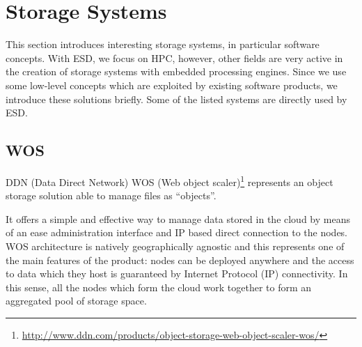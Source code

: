 \section{Storage Systems}
\label{sec: background/storage systems}

This section introduces interesting storage systems, in particular software concepts.
With ESD, we focus on HPC, however, other fields are very active in the creation of storage systems with embedded processing engines.
Since we use some low-level concepts which are exploited by existing software products, we introduce these solutions briefly.
Some of the listed systems are directly used by ESD.

\subsection{WOS}
\label{WOS background}

DDN (Data Direct Network) WOS (Web object scaler)\footnote{\url{http://www.ddn.com/products/object-storage-web-object-scaler-wos/}} represents an object storage solution able to manage files as ``objects''.

It offers a simple and effective way to manage data stored in the cloud by means of an ease administration interface and IP based direct connection to the nodes.
WOS architecture is natively geographically agnostic and this represents one of the main features of the product: nodes can be deployed anywhere and the access to data which they host is guaranteed by Internet Protocol (IP) connectivity.
In this sense, all the nodes which form the cloud work together to form an aggregated pool of storage space.

